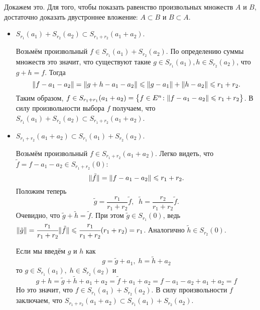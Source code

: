 \begin{exmp}
\begin{center}
\begin{tikzpicture}
        \end{tikzpicture}
    \end{center}

    Докажем это.
    Для того, чтобы показать равенство произвольных множеств $A$ и $B$, достаточно доказать двустроннее вложение: 
    $A \subset B$ и $B \subset A$.
    \begin{itemize}
        \item 
            $S_{r_1}(a_1) + S_{r_2}(a_2) \subset S_{r_1 + r_2}(a_1 + a_2)$. 

            Возьмём произвольный $f \in S_{r_1}(a_1) + S_{r_2}(a_2)$.
            По определению суммы множеств это значит, что существуют такие $g \in S_{r_1}(a_1), h \in S_{r_2}(a_2)$, что $g + h = f$.
            Тогда 
            \begin{equation*}
                \Norm{f - a_1 - a_2} = \Norm{g + h - a_1 - a_2} \leqslant \Norm{g - a_1} + \Norm{h - a_2} \leqslant r_1 + r_2.
            \end{equation*}
            Таким образом, $f \in S_{r_1 + r_1}(a_1 + a_2) = \bigl\{f \in E^n \colon \Norm{f - a_1 - a_2} \leqslant r_1 + r_2 \bigr\}$.
            В силу произвольности выбора $f$ получаем, что $S_{r_1}(a_1) + S_{r_2}(a_2) \subset S_{r_1 + r_2}(a_1 + a_2)$.
        \item 
            $S_{r_1 + r_2}(a_1 + a_2) \subset S_{r_1}(a_1) + S_{r_2}(a_2)$.

            Возьмём произвольный $f \in S_{r_1 + r_2}(a_1 + a_2)$.
            Легко видеть, что ${\tilde{f} = f - a_1 - a_2 \in S_{r_1 + r_2}(0)}$:
            \begin{equation*}
                \Norm{\tilde{f}} = \Norm{f - a_1 - a_2} \leqslant r_1 + r_2.
            \end{equation*}
            Положим теперь 
            \begin{equation*}
                \tilde{g} = \frac{r_1}{r_1 + r_2} \tilde{f}, \;\; \tilde{h} = \frac{r_2}{r_1 + r_2} \tilde{f}.
            \end{equation*}
            Очевидно, что $\tilde{g} + \tilde{h} = \tilde{f}$.
            При этом $\tilde{g} \in S_{r_1}(0)$, ведь $\Norm{\tilde{g}} = \cfrac{r_1}{r_1 + r_2}\Norm{\tilde{f}} \leqslant \cfrac{r_1}{r_1 + r_2} (r_1 + r_2) = r_1$.
            Аналогично $\tilde{h} \in S_{r_2}(0)$.

            Если мы введём $g$ и $h$ как 
            \begin{equation*}
                g = \tilde{g} + a_1, \; h = \tilde{h} + a_2
            \end{equation*}
            то $g \in S_{r_1}(a_1), \; h \in S_{r_2}(a_2)$ и 
            \begin{equation*}
                g + h = \tilde{g} + \tilde{h} + a_1 + a_2 = \tilde{f} + a_1 + a_2 = f - a_1 - a_2 + a_1 + a_2 = f
            \end{equation*}
            Но это значит, что $f \in S_{r_1}(a_1) + S_{r_2}(a_2)$.
            В силу произвольности $f$ заключаем, что $S_{r_1 + r_2}(a_1 + a_2) \subset S_{r_1}(a_1) + S_{r_2}(a_2)$.
    \end{itemize}
\end{exmp}

